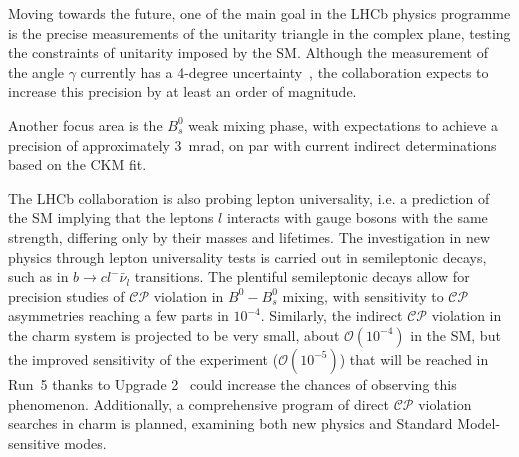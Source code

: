 

Moving towards the future, one of the main goal in the LHCb physics programme is the precise measurements of the unitarity triangle in the complex plane, testing the constraints of unitarity imposed by the SM. 
Although the measurement of the angle $\gamma$ currently has a 4-degree uncertainty~\cite{LHCb:2021dcr}, the collaboration expects to increase this precision by at least an order of magnitude. 

Another focus area is the $B_s^0$ weak mixing phase, with expectations to achieve a precision of approximately \SI{3}{\milli\radian}, on par with current indirect determinations based on the CKM fit.

The LHCb collaboration is also probing lepton universality, i.e. a prediction of the SM implying that the leptons $l$ interacts with gauge bosons with the same strength, differing only by their masses and lifetimes.
The investigation in new physics through lepton universality tests is carried out in semileptonic decays, such as in $b\rightarrow c l^-\bar{\nu}_l$ transitions. The plentiful semileptonic decays allow for precision studies of $\mathcal{CP}$ violation in $B^0-B^0_s$ mixing, with sensitivity to $\mathcal{CP}$ asymmetries reaching a few parts in $10^{−4}$. Similarly, the indirect $\mathcal{CP}$ violation in the charm system is projected to be very small, about $\mathcal{O}(10^{-4})$ in the SM, but the improved sensitivity of the experiment ($\mathcal{O}(10^{−5})$) that will be reached in Run~5 thanks to Upgrade 2~\cite{lhcbcollaboration2019physics} could increase the chances of observing this phenomenon. Additionally, a comprehensive program of direct $\mathcal{CP}$ violation searches in charm is planned, examining both new physics and Standard Model-sensitive modes.

